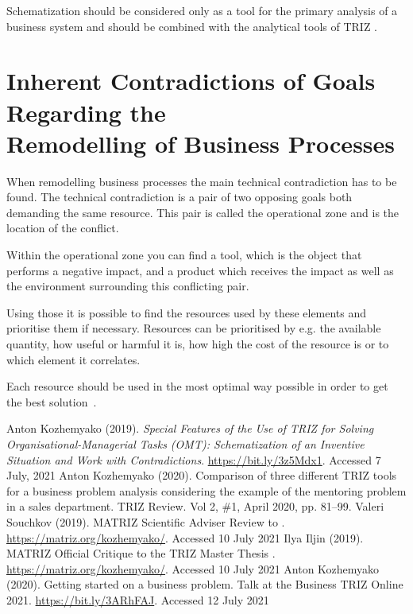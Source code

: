 \documentclass[a4paper,11pt]{article}
\begin{document}
Schematization should be considered only as a tool for the primary analysis of
a business system and should be combined with the analytical tools of TRIZ
\cite{K1}.

\section{Inherent Contradictions of Goals Regarding the\\ Remodelling of
  Business Processes} 

When remodelling business processes the main technical contradiction has to be
found. The technical contradiction is a pair of two opposing goals both
demanding the same resource. This pair is called the operational zone and is
the location of the conflict.

Within the operational zone you can find a tool, which is the object that
performs a negative impact, and a product which receives the impact as well as
the environment surrounding this conflicting pair.

Using those it is possible to find the resources used by these elements and
prioritise them if necessary. Resources can be prioritised by e.g. the
available quantity, how useful or harmful it is, how high the cost of the
resource is or to which element it correlates.

Each resource should be used in the most optimal way possible in order to get
the best solution~\cite{K1}. 

\raggedright
\begin{thebibliography}{xxx}
 Anton Kozhemyako (2019).  \emph{Special Features of the Use of
  TRIZ for Solving Organisational-Managerial Tasks (OMT): Schematization of an
  Inventive Situation and Work with Contradictions}.
  \url{https://bit.ly/3z5Mdx1}. Accessed 7 July, 2021
 Anton Kozhemyako (2020). Comparison of three different TRIZ tools
  for a business problem analysis considering the example of the mentoring
  problem in a sales department. TRIZ Review. Vol 2, \#1, April 2020,
  pp. 81--99.
 Valeri Souchkov (2019). MATRIZ Scientific Adviser Review to
  \cite{K1}.  \url{https://matriz.org/kozhemyako/}. Accessed 10 July 2021
 Ilya Iljin (2019). MATRIZ Official Critique to the TRIZ Master
  Thesis \cite{K1}.  \url{https://matriz.org/kozhemyako/}. Accessed 10 July
  2021
 Anton Kozhemyako (2020). Getting started on a business problem.
  Talk at the Business TRIZ Online 2021.
  \url{https://bit.ly/3ARhFAJ}. Accessed 12 July 2021
\end{thebibliography}
\end{document}
